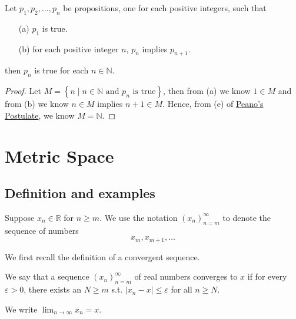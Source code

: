 \begin{theorem}
    Let \(p_1, p_2, \dots , p_n\) be propositions, one for each positive integers, such that 
    \begin{itemize}
        \item [(a)] \(p_1\) is true. 
        \item [(b)] for each positive integer \(n\), \(p_n\) implies \(p_{n+1}\).    
    \end{itemize} 
    then \(p_n\) is true for each \(n \in \mathbb{N}\).  
\end{theorem}
\begin{proof}
    Let \(M= \left\{ n \mid n \in \mathbb{N} \text{ and } p_n \text{ is true} \right\} \), then from (a) we know \(1 \in M\) and from (b) we know \(n \in M\) implies \(n+1 \in M\).  Hence, from (e) of \hyperref[thm: Peano's postulate]{Peano's Postulate}, we know \(M = \mathbb{N} \).   
\end{proof}

\chapter{Metric Space}
\section{Definition and examples}
\begin{definition}
    Suppose \(x_n \in \mathbb{R} \) for \(n \ge m\). We use the notation \(\left( x_n \right)_{n = m}^{\infty}  \) to denote the sequence of numbers 
\[
    x_m, x_{m+1}, \dots 
\]   
\end{definition}

We first recall the definition of a convergent sequence. 
\begin{definition}\label{dfn: convergent sequence}
    We say that a sequence \(\left( x_n \right)_{n=m}^{\infty}\) of real numbers converges to \(x\) if for every \(\varepsilon > 0\), there exists an \(N \geq m\) s.t. \(\vert x_n - x \vert \le \varepsilon  \) for all \(n \ge N\). 
    \begin{notation}
    We write \(\lim_{n \to \infty} x_n = x\). 
\end{notation}     
\end{definition}

